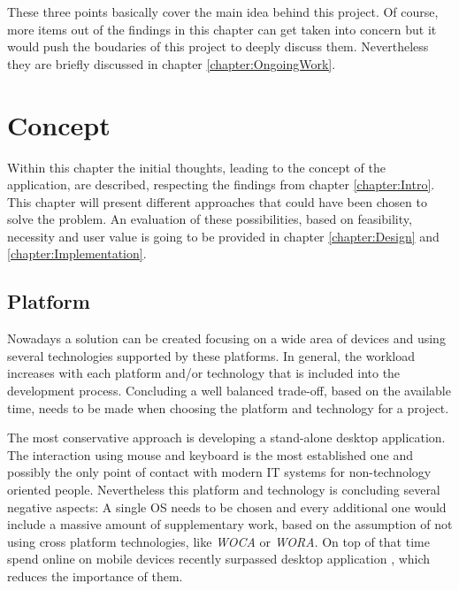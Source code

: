 These three points basically cover the main idea behind this project. Of course, more items out of the findings in this chapter can get taken into concern but it would push the boudaries of this project to deeply discuss them. Nevertheless they are briefly discussed in chapter \vref{chapter:OngoingWork}.

\chapter{Concept}
\label{chapter:Concept}
Within this chapter the initial thoughts, leading to the concept of the application, are described, respecting the findings from chapter \ref{chapter:Intro}. This chapter will present different approaches that could have been chosen to solve the problem. An evaluation of these possibilities, based on feasibility, necessity and user value is going to be provided in chapter \vref{chapter:Design} and \vref{chapter:Implementation}.

\section{Platform} %
\label{sec:Platform}
Nowadays a solution can be created focusing on a wide area of devices and using several technologies supported by these platforms. In general, the workload increases with each platform and/or technology that is included into the development process. Concluding a well balanced trade-off, based on the available time, needs to be made when choosing the platform and technology for a project.

The most conservative approach is developing a stand-alone desktop application. The interaction using mouse and keyboard is the most established one and possibly the only point of contact with modern \gls{IT} systems for non-technology oriented people. Nevertheless this platform and technology is concluding several negative aspects: A single \gls{OS} needs to be chosen and every additional one would include a massive amount of supplementary work, based on the assumption of not using cross platform technologies, like \emph{\Acrfull{WOCA}} or \emph{\Acrfull{WORA}}. On top of that time spend online on mobile devices recently surpassed desktop application \cite{Murtagh:2014aa}, which reduces the importance of them. 

